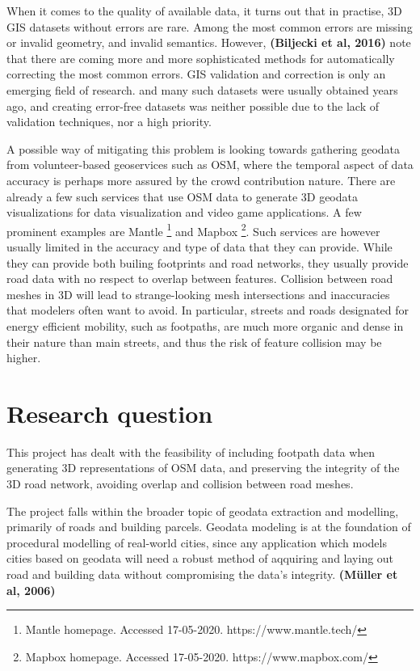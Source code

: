 \documentclass{kththesis}
\begin{document}
When it comes to the quality of available data, it turns out that in practise, 3D GIS datasets without errors are rare.
Among the most common errors are missing or invalid geometry, and invalid semantics.
However, \textbf{(Biljecki et al, 2016)} note that there are coming more and more sophisticated methods for automatically correcting the most common errors.
GIS validation and correction is only an emerging field of research.
and many such datasets were usually obtained years ago, and creating error-free datasets was neither possible due to the lack of validation techniques, nor a high priority.

A possible way of mitigating this problem is looking towards gathering geodata from volunteer-based geoservices such as OSM, where the temporal aspect of data accuracy is perhaps more assured by the crowd contribution nature.
There are already a few such services that use OSM data to generate 3D geodata visualizations for data visualization and video game applications.
A few prominent examples are Mantle
\footnote{Mantle homepage. Accessed 17-05-2020. https://www.mantle.tech/}
and Mapbox
\footnote{Mapbox homepage. Accessed 17-05-2020. https://www.mapbox.com/}.
Such services are however usually limited in the accuracy and type of data that they can provide.
While they can provide both builing footprints and road networks, they usually provide road data with no respect to overlap between features.
Collision between road meshes in 3D will lead to strange-looking mesh intersections and inaccuracies that modelers often want to avoid.
In particular, streets and roads designated for energy efficient mobility, such as footpaths, are much more organic and dense in their nature than main streets, and thus the risk of feature collision may be higher.

\section{Research question}

This project has dealt with the feasibility of including footpath data when generating 3D representations of OSM data, and preserving the integrity of the 3D road network, avoiding overlap and collision between road meshes.

The project falls within the broader topic of geodata extraction and modelling, primarily of roads and building parcels.
Geodata modeling is at the foundation of procedural modelling of real-world cities, since any application which models cities based on geodata will need a robust method of aqquiring and laying out road and building data without compromising the data's integrity. \textbf{(Müller et al, 2006)}
\end{document}
